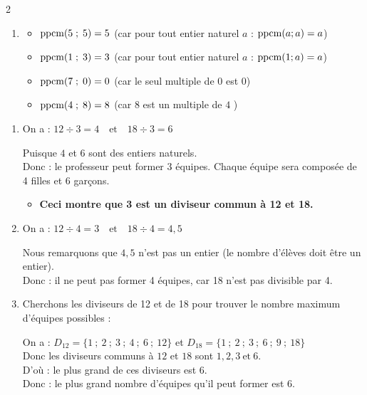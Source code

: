 \documentclass[10pt, a4paper]{article}
\begin{document}
\begin{multicols*}{2}
\begin{Solution}[APPLICATION][10]
\begin{enumerate}[leftmargin=*,itemsep=0.5pt]
    \item
    \begin{itemize}[leftmargin=*,itemsep=0.5pt]
        \item $\operatorname{ppcm}(5 \; ; \; 5) = 5$ \quad
        (car pour tout entier naturel $a$ : $\operatorname{ppcm}(a ; a) = a$)
        \item $\operatorname{ppcm}(1 \; ; \; 3) = 3$ \quad
        (car pour tout entier naturel $a$ : $\operatorname{ppcm}(1 ; a) = a$)
        \item $\operatorname{ppcm}(7 \; ; \; 0) = 0$ \quad
        (car le seul multiple de $0$ est $0$)
        \item $\operatorname{ppcm}(4 \; ; \; 8) = 8$ \quad
        (car $8$ est un multiple de $4$ )
    \end{itemize}

\end{enumerate}
\end{Solution}

\begin{Solution}[ACTIVITÉ][5]
\begin{enumerate}[leftmargin=*,itemsep=0.5pt]
    \item On a : \quad    $12 \div 3 = 4   \quad \text{et}  \quad 18 \div 3 = 6$

    Puisque $4$ et $6$ sont des entiers naturels. \\
    Donc : le professeur peut former 3 équipes. Chaque équipe sera composée de 4 filles et 6 garçons.

    \begin{itemize}[label=$\blacktriangleright$, leftmargin=*, nosep]
    \item \textbf{Ceci montre que 3 est un \textcolor{PrimaryColor}{diviseur commun} à 12 et 18.}
    \end{itemize}

    \item On a : \quad $12 \div 4 = 3   \quad \text{et}  \quad     18 \div 4 = 4,5$

    Nous remarquons que $4,5$ n'est pas un entier (le nombre d'élèves doit être un entier). \\
    Donc : \quad il ne peut pas former 4 équipes, car 18 n'est pas divisible par 4.

    \item Cherchons les diviseurs de 12 et de 18 pour trouver le nombre maximum d'équipes possibles :

    On a : $D_{12} = \big\{1~;~2~;~3~;~4~;~6~;~12\big\}$ \quad et \quad
    $D_{18} = \big\{1~;~2~;~3~;~6~;~9~;~18\big\}$ \\
    Donc les diviseurs communs à $12$ et $18$ sont $1, 2, 3 ~\text{et}~6$. \\
    D'où : le plus grand de ces diviseurs est $6$. \\
    Donc : le plus grand nombre d'équipes qu'il peut former est $6$.


\end{enumerate}
\end{Solution}
\end{multicols*}
\end{document}

